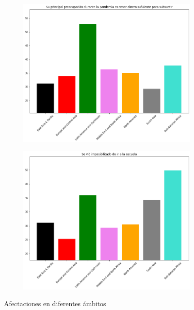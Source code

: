 \documentclass[12pt]{article}
\begin{document}
\begin{figure}
\begin{subfigure}[b]{0.45\textwidth}
         \caption{}
         \label{fig:212}
     \end{subfigure}
     \hfill
     \begin{subfigure}[b]{0.45\textwidth}
         \centering
         \includegraphics[width=\textwidth]{images/213.png}
         \caption{}
         \label{fig:213}
     \end{subfigure}
     \hfill
     \begin{subfigure}[b]{0.45\textwidth}
         \centering
         \includegraphics[width=\textwidth]{images/214.png}
         \caption{}
         \label{fig:214}
     \end{subfigure}
        \caption{Afectaciones en diferentes ámbitos}
        \label{fig:21}
\end{figure}
\end{document}
